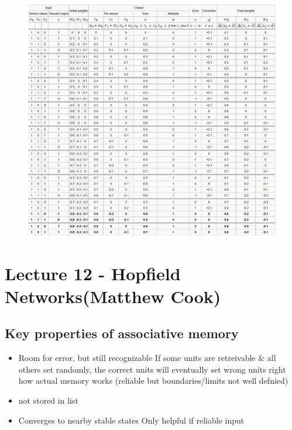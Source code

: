 \documentclass[english,11pt]{article}
\begin{document}
\begin{figure}[h!]
  \centerline{\includegraphics[width=1.5\textwidth]{perceptron_example.png}}
\end{figure}




\section{Lecture 12 - Hopfield Networks(Matthew Cook)}
\subsection*{Key properties of associative memory}
\begin{itemize}
\item Room for error, but still recognizable
\subitem If some units are retreivable \& all others set randomly, the correct units will eventually set wrong units right
\subitem how actual memory works (reliable but boundaries/limits not well defnied)
\item not stored in list
\item Converges to nearby stable states
\subitem Only helpful if reliable input
\end{itemize}
\end{document}
